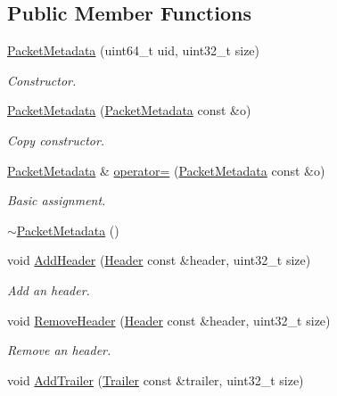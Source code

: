\subsection*{Public Member Functions}
\begin{DoxyCompactItemize}
\item 
\hyperlink{classns3_1_1PacketMetadata_a3c1a7bc063be52d90c9bdf7dbbcfeff7}{Packet\+Metadata} (uint64\+\_\+t uid, uint32\+\_\+t size)
\begin{DoxyCompactList}\small\item\em Constructor. \end{DoxyCompactList}\item 
\hyperlink{classns3_1_1PacketMetadata_acc6ec4194d1858d85ffc8ccf68535a37}{Packet\+Metadata} (\hyperlink{classns3_1_1PacketMetadata}{Packet\+Metadata} const \&o)
\begin{DoxyCompactList}\small\item\em Copy constructor. \end{DoxyCompactList}\item 
\hyperlink{classns3_1_1PacketMetadata}{Packet\+Metadata} \& \hyperlink{classns3_1_1PacketMetadata_a808cc741d74271cce313d5a0691de5b7}{operator=} (\hyperlink{classns3_1_1PacketMetadata}{Packet\+Metadata} const \&o)
\begin{DoxyCompactList}\small\item\em Basic assignment. \end{DoxyCompactList}\item 
\hyperlink{classns3_1_1PacketMetadata_a3e5d8647a8dbf2d041e8275805b1692f}{$\sim$\+Packet\+Metadata} ()
\item 
void \hyperlink{classns3_1_1PacketMetadata_abdce736c4c5f647242f0808c0d2f9249}{Add\+Header} (\hyperlink{classns3_1_1Header}{Header} const \&header, uint32\+\_\+t size)
\begin{DoxyCompactList}\small\item\em Add an header. \end{DoxyCompactList}\item 
void \hyperlink{classns3_1_1PacketMetadata_afa8a589ec783d4998516d7f39f21242d}{Remove\+Header} (\hyperlink{classns3_1_1Header}{Header} const \&header, uint32\+\_\+t size)
\begin{DoxyCompactList}\small\item\em Remove an header. \end{DoxyCompactList}\item 
void \hyperlink{classns3_1_1PacketMetadata_afd698b5f0ce0e9f498fff8a6915837c5}{Add\+Trailer} (\hyperlink{classns3_1_1Trailer}{Trailer} const \&trailer, uint32\+\_\+t size)

\end{DoxyCompactItemize}
